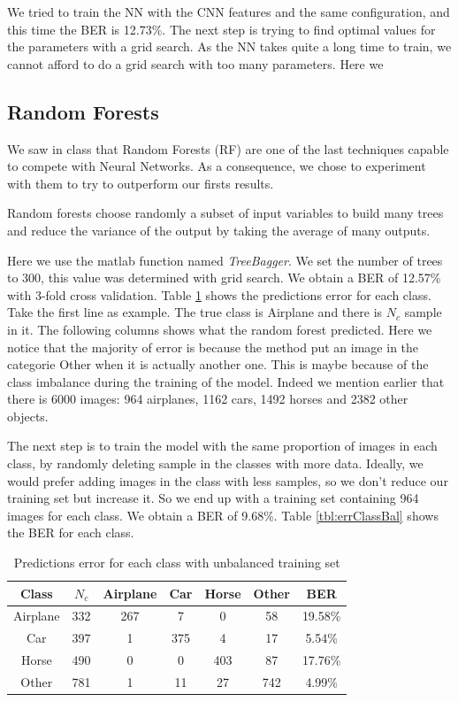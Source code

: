 \documentclass{article} %
\begin{document}
We tried to train the NN with the CNN features and the same configuration, and this time the BER is 12.73\%.
The next step is trying to find optimal values for the parameters with a grid search. As the NN takes quite a long time to train, we cannot afford to do a grid search with too many parameters.
Here we 


\subsection{Random Forests}
We saw in class that Random Forests (RF) are one of the last techniques capable to compete with Neural Networks.
As a consequence, we chose to experiment with them to try to outperform our firsts results.

Random forests choose randomly a subset of input variables to build many trees and reduce the variance of the output by taking the average of many outputs.

Here we use the matlab function named \emph{TreeBagger}. We set the number of trees to 300, this value was determined with grid search.
We obtain a BER of 12.57\% with 3-fold cross validation. Table \ref{tbl:errClassNotBal} shows the predictions error for each class. Take the first line as example. The true class is Airplane and there is $N_c$ sample in it. The following columns shows what the random forest predicted.
Here we notice that the majority of error is because the method put an image in the categorie Other when it is actually another one.
This is maybe because of the class imbalance during the training of the model. Indeed we mention earlier that there is 6000 images: 964 airplanes, 1162 cars, 1492 horses and 2382 other objects.

The next step is to train the model with the same proportion of images in each class, by randomly deleting sample in the classes with more data. Ideally, we would prefer adding images in the class with less samples, so we don't reduce our training set but increase it.
So we end up with a training set containing 964 images for each class. 
We obtain a BER of 9.68\%. Table \ref{tbl:errClassBal} shows the BER for each class.

\begin{table}[!htb]
	\centering
		\begin{tabular}{|c|c|c|c|c|c|c|}
			\hline Class & $N_{c}$ & Airplane & Car & Horse & Other & BER \\ 
			\hline Airplane & 332 & 267 & 7 & 0 & 58 & 19.58\% \\ 
			\hline Car & 397 & 1 & 375 & 4 & 17 & 5.54\% \\ 
			\hline Horse & 490 & 0 & 0 & 403 & 87 & 17.76\% \\ 
			\hline Other & 781 & 1 & 11 & 27 & 742 & 4.99\% \\ 
			\hline 
		\end{tabular} 
		\caption{Predictions error for each class with unbalanced training set}
		\label{tbl:errClassNotBal}
\end{table}
\end{document}
